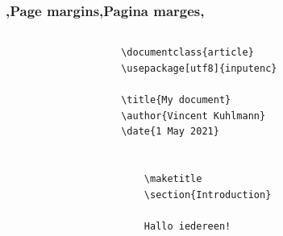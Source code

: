 \unless\ifishandout
\begin{frame}[fragile]
    \frametitle{\lang,Page margins,Pagina marges,}
    \begin{columns}
        \begin{column}{0.67\textwidth}
            \begin{codebox}
                \begin{verbatim}
                    \documentclass{article}
                    \usepackage[utf8]{inputenc}

                    \title{My document}
                    \author{Vincent Kuhlmann}
                    \date{1 May 2021}
                    
                    
                        \maketitle
                        \section{Introduction}
                        
                        Hallo iedereen!
                    

\end{verbatim}
\end{codebox}
\end{column}
\end{columns}
\end{frame}
